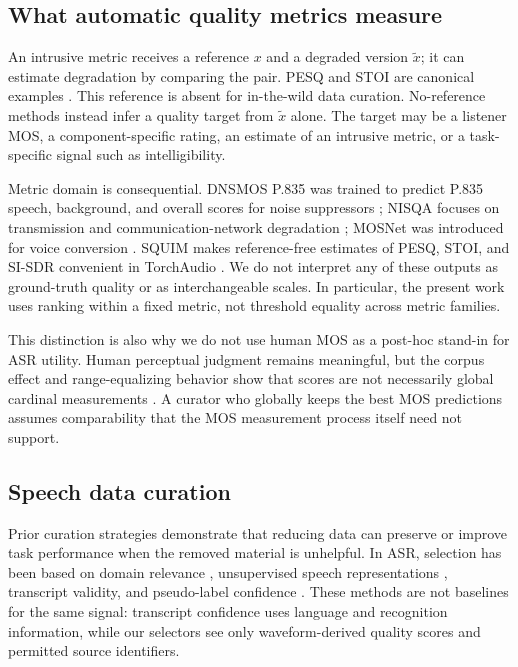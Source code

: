 \documentclass[10pt,twocolumn]{article}
\newcommand{\dns}{\textsc{DNSMOS}}
\newcommand{\squim}{\textsc{SQUIM}}
\newcommand{\asr}{\textsc{ASR}}
\begin{document}
\subsection{What automatic quality metrics measure}

An intrusive metric receives a reference $x$ and a degraded version $\tilde{x}$; it can estimate degradation by comparing the pair. PESQ and STOI are canonical examples \citep{rix2001pesq,taal2011stoi}. This reference is absent for in-the-wild data curation. No-reference methods instead infer a quality target from $\tilde{x}$ alone. The target may be a listener MOS, a component-specific rating, an estimate of an intrusive metric, or a task-specific signal such as intelligibility.

Metric domain is consequential. \dns{} P.835 was trained to predict P.835 speech, background, and overall scores for noise suppressors \citep{reddy2022dnsmosp835}; NISQA focuses on transmission and communication-network degradation \citep{mittag2021nisqa}; MOSNet was introduced for voice conversion \citep{lo2019mosnet}. \squim{} makes reference-free estimates of PESQ, STOI, and SI-SDR convenient in TorchAudio \citep{kumar2023squim}. We do not interpret any of these outputs as ground-truth quality or as interchangeable scales. In particular, the present work uses ranking within a fixed metric, not threshold equality across metric families.

This distinction is also why we do not use human MOS as a post-hoc stand-in for \asr{} utility. Human perceptual judgment remains meaningful, but the corpus effect and range-equalizing behavior show that scores are not necessarily global cardinal measurements \citep{cooper2023range,pieper2024alignnet}. A curator who globally keeps the best MOS predictions assumes comparability that the MOS measurement process itself need not support.

\subsection{Speech data curation}

Prior curation strategies demonstrate that reducing data can preserve or improve task performance when the removed material is unhelpful. In \asr{}, selection has been based on domain relevance \citep{park2022contrastive}, unsupervised speech representations \citep{lu2022discrete}, transcript validity, and pseudo-label confidence \citep{rangappa2025multistage}. These methods are not baselines for the same signal: transcript confidence uses language and recognition information, while our selectors see only waveform-derived quality scores and permitted source identifiers.
\end{document}
